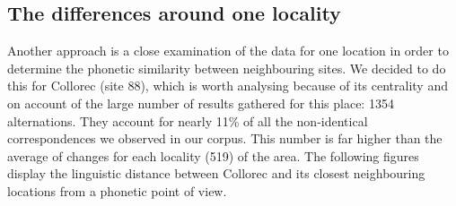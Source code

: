 \documentclass[output=paper]{LSP/langsci}
\begin{document}
\subsection[The differences around one locality]{The differences around one locality}

Another approach is a close examination of the data for one location in order to determine the phonetic similarity between neighbouring sites. We decided to do this for Collorec (site 88), which is worth analysing because of its centrality and on account of the large number of results gathered for this place: 1354 alternations. They account for nearly 11\% of all the non-identical correspondences we observed in our corpus. This number is far higher than the average of changes for each locality (519) of the area. The following figures display the linguistic distance between Collorec and its closest neighbouring locations from a phonetic point of view.

\begin{table}
\caption{Number of differences to neighbouring sites around Collorec (site 88)}
\label{tab:brun:8}
\end{table}
\end{document}
